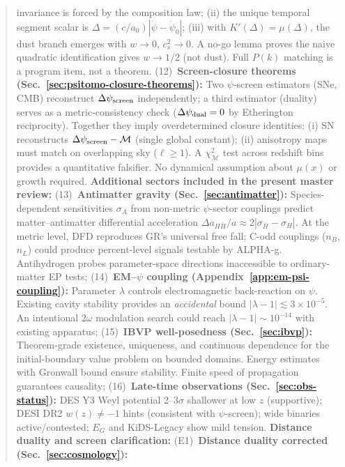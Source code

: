 \documentclass[aps,prd,twocolumn,superscriptaddress,showpacs,floatfix,nofootinbib]{revtex4-2}
\theoremstyle{plain}
\theoremstyle{definition}
\theoremstyle{remark}
\begin{document}
\begin{abstract}
invariance is forced by the composition law; (ii) the unique temporal segment scalar is $\Delta = (c/a_0)|\dot\psi - \dot\psi_0|$;
(iii) with $K'(\Delta) = \mu(\Delta)$, the dust branch emerges with $w \to 0$, $c_s^2 \to 0$. A no-go lemma proves the naive 
quadratic identification gives $w \to 1/2$ (not dust). Full $P(k)$ matching is a program item, not a theorem.
%
(12)~\textbf{Screen-closure theorems (Sec.~\ref{sec:psitomo-closure-theorems}):} Two $\psi$-screen estimators (SNe, CMB) 
reconstruct $\Delta\psi_{\rm screen}$ independently; a third estimator (duality) serves as a metric-consistency check 
($\Delta\psi_{\rm dual}=0$ by Etherington reciprocity). Together they imply overdetermined closure identities: 
(i) SN reconstructs $\Delta\psi_{\rm screen} - \mathcal{M}$ 
(single global constant); (ii) anisotropy maps must match on overlapping sky ($\ell \ge 1$). A $\chi^2_{\mathcal{M}}$ test across 
redshift bins provides a quantitative falsifier. No dynamical assumption about $\mu(x)$ or growth required.
%
\textbf{Additional sectors included in the present master review:}
%
(13)~\textbf{Antimatter gravity (Sec.~\ref{sec:antimatter}):} Species-dependent sensitivities $\sigma_A$ from non-metric 
$\psi$-sector couplings predict matter--antimatter differential acceleration $\Delta a_{H\bar{H}}/a \approx 2|\sigma_{\bar{H}} - \sigma_H|$. 
At the metric level, DFD reproduces GR's universal free fall; C-odd couplings ($n_B$, $n_L$) could produce percent-level signals 
testable by ALPHA-g. Antihydrogen probes parameter-space directions inaccessible to ordinary-matter EP tests;
%
(14)~\textbf{EM--$\psi$ coupling (Appendix~\ref{app:em-psi-coupling}):} Parameter $\lambda$ controls electromagnetic back-reaction 
on $\psi$. Existing cavity stability provides an \emph{accidental} bound $|\lambda - 1| \lesssim 3 \times 10^{-5}$. 
An intentional $2\omega$ modulation search could reach $|\lambda - 1| \sim 10^{-14}$ with existing apparatus;
%
(15)~\textbf{IBVP well-posedness (Sec.~\ref{sec:ibvp}):} Theorem-grade existence, uniqueness, and continuous dependence 
for the initial-boundary value problem on bounded domains. Energy estimates with Gronwall bound ensure stability. 
Finite speed of propagation guarantees causality;
%
(16)~\textbf{Late-time observations (Sec.~\ref{sec:obs-status}):} DES Y3 Weyl potential 2--3$\sigma$ shallower at low $z$ 
(supportive); DESI DR2 $w(z) \neq -1$ hints (consistent with $\psi$-screen); wide binaries active/contested; 
$E_G$ and KiDS-Legacy show mild tension.
%
\textbf{Distance duality and screen clarification:}
%
(E1)~\textbf{Distance duality corrected (Sec.~\ref{sec:cosmology}):}

\end{abstract}
\end{document}
